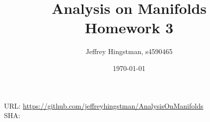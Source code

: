\documentclass[a4paper, 12pt]{article}
\newcommand{\reponame}{https://github.com/jeffreyhingstman/AnalysisOnManifolds}    %
\begin{document}
	\title{Analysis on Manifolds \\[0.5cm] \large{Homework 3}} 
	\date{\today}
	\author{Jeffrey Hingstman, s4590465}	\maketitle
	\vspace*{\fill}
	\noindent
	URL: \url{\reponame} \\
	SHA: \commithash
	\clearpage
	
	

	
\end{document}
